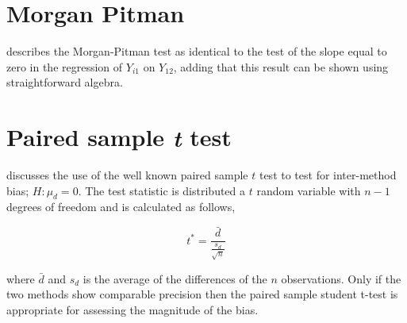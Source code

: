 \documentclass[12pt, a4paper]{report}
\theoremstyle{plain}
\theoremstyle{definition}
\theoremstyle{remark}
\begin{document}
	
	
	
	
	
	
	\section{Morgan Pitman}

	\citet{Bartko} describes the Morgan-Pitman test as identical to
	the test of the slope equal to zero in the regression of $Y_{i1}$
	on $Y_{12}$, adding that this result can be shown using
	straightforward algebra.
	

	
	




	




			\section{Paired sample \emph{t} test}
			
			\citet{Bartko} discusses the use of the well known paired sample
			$t$ test to test for inter-method bias; $H: \mu_{d}=0$. The test
			statistic is distributed a $t$ random variable with $n-1$ degrees
			of freedom and is calculated as follows,
			
			\begin{equation}
			t^{*} = \frac{\bar{d}}{ \frac{s_{d}}{\sqrt{n}}}
			\end{equation}
			
			where $\bar{d}$ and $s_{d}$ is the average of the differences of
			the $n$ observations. Only if the two methods show comparable
			precision then the paired sample student t-test is appropriate for
			assessing the magnitude of the bias.
			
\end{document}
